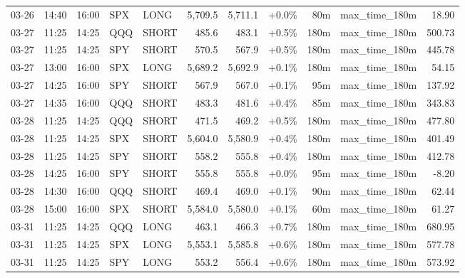 \documentclass[11pt,a4paper,twoside]{article}
\begin{document}
\begin{center}
\begin{longtable}{>{\color{txtmain}}l l l l l r r r r >{\color{txtmain}}l r}
03-26 & 14:40 & 16:00 & SPX & LONG & 5,709.5 & 5,711.1 & \textcolor{wingreen}{+0.0\%} & 80m & max\_time\_180m & \textcolor{wingreen}{18.90} \\
03-27 & 11:25 & 14:25 & QQQ & SHORT & 485.6 & 483.1 & \textcolor{wingreen}{+0.5\%} & 180m & max\_time\_180m & \textcolor{wingreen}{500.73} \\
03-27 & 11:25 & 14:25 & SPY & SHORT & 570.5 & 567.9 & \textcolor{wingreen}{+0.5\%} & 180m & max\_time\_180m & \textcolor{wingreen}{445.78} \\
03-27 & 13:00 & 16:00 & SPX & LONG & 5,689.2 & 5,692.9 & \textcolor{wingreen}{+0.1\%} & 180m & max\_time\_180m & \textcolor{wingreen}{54.15} \\
03-27 & 14:25 & 16:00 & SPY & SHORT & 567.9 & 567.0 & \textcolor{wingreen}{+0.1\%} & 95m & max\_time\_180m & \textcolor{wingreen}{137.92} \\
03-27 & 14:35 & 16:00 & QQQ & SHORT & 483.3 & 481.6 & \textcolor{wingreen}{+0.4\%} & 85m & max\_time\_180m & \textcolor{wingreen}{343.83} \\
03-28 & 11:25 & 14:25 & QQQ & SHORT & 471.5 & 469.2 & \textcolor{wingreen}{+0.5\%} & 180m & max\_time\_180m & \textcolor{wingreen}{477.80} \\
03-28 & 11:25 & 14:25 & SPX & SHORT & 5,604.0 & 5,580.9 & \textcolor{wingreen}{+0.4\%} & 180m & max\_time\_180m & \textcolor{wingreen}{401.49} \\
03-28 & 11:25 & 14:25 & SPY & SHORT & 558.2 & 555.8 & \textcolor{wingreen}{+0.4\%} & 180m & max\_time\_180m & \textcolor{wingreen}{412.78} \\
03-28 & 14:25 & 16:00 & SPY & SHORT & 555.8 & 555.8 & \textcolor{wingreen}{+0.0\%} & 95m & max\_time\_180m & \textcolor{lossred}{-8.20} \\
03-28 & 14:30 & 16:00 & QQQ & SHORT & 469.4 & 469.0 & \textcolor{wingreen}{+0.1\%} & 90m & max\_time\_180m & \textcolor{wingreen}{62.44} \\
03-28 & 15:00 & 16:00 & SPX & SHORT & 5,584.0 & 5,580.0 & \textcolor{wingreen}{+0.1\%} & 60m & max\_time\_180m & \textcolor{wingreen}{61.27} \\
03-31 & 11:25 & 14:25 & QQQ & LONG & 463.1 & 466.3 & \textcolor{wingreen}{+0.7\%} & 180m & max\_time\_180m & \textcolor{wingreen}{680.95} \\
03-31 & 11:25 & 14:25 & SPX & LONG & 5,553.1 & 5,585.8 & \textcolor{wingreen}{+0.6\%} & 180m & max\_time\_180m & \textcolor{wingreen}{577.78} \\
03-31 & 11:25 & 14:25 & SPY & LONG & 553.2 & 556.4 & \textcolor{wingreen}{+0.6\%} & 180m & max\_time\_180m & \textcolor{wingreen}{573.92} \\

\end{longtable}
\end{center}
\end{document}
